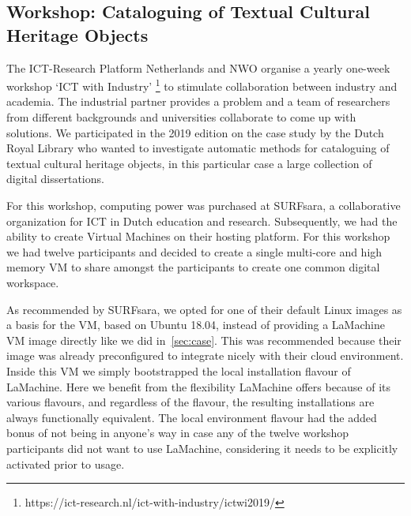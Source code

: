\documentclass[a4paper,11pt]{article}
\begin{document}

\subsection{Workshop: Cataloguing of Textual Cultural Heritage Objects}
\label{sec:case2}

The ICT-Research Platform Netherlands and NWO organise a yearly one-week workshop `ICT with Industry'
\footnote{https://ict-research.nl/ict-with-industry/ictwi2019/} to stimulate collaboration between industry and
academia. The industrial partner provides a problem and a team of researchers from different backgrounds and
universities collaborate to come up with solutions. We participated in the 2019 edition on the case study by the Dutch Royal Library who wanted to investigate automatic methods for cataloguing of textual cultural heritage objects, in this particular case a large collection of digital dissertations.

For this workshop, computing power was purchased at SURFsara, a collaborative organization for ICT in Dutch education
and research. Subsequently, we had the ability to create Virtual Machines on their hosting platform. For this workshop
we had twelve participants and decided to create a single multi-core and high memory VM to share amongst the
participants to create one common digital workspace.

As recommended by SURFsara, we opted for one of their default Linux images as a basis for the VM, based on Ubuntu 18.04,
instead of providing a LaMachine VM image directly like we did in~\ref{sec:case}. This was recommended because their image
was already preconfigured to integrate nicely with their cloud environment. Inside this VM we simply bootstrapped the local
installation flavour of LaMachine.  Here we benefit from the flexibility LaMachine offers because of its various
flavours, and regardless of the flavour, the resulting installations are always functionally equivalent. The local
environment flavour had the added bonus of not being in anyone's way in case any of the twelve workshop participants did
not want to use LaMachine, considering it needs to be explicitly activated prior to usage.
\end{document}
